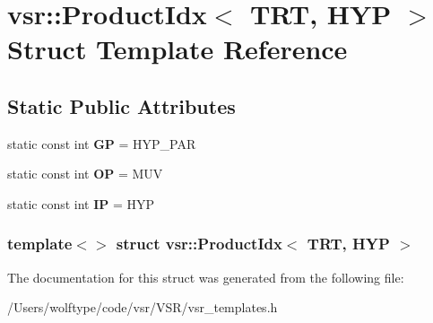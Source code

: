 \hypertarget{structvsr_1_1_product_idx_3_01_t_r_t_00_01_h_y_p_01_4}{\section{vsr\-:\-:Product\-Idx$<$ T\-R\-T, H\-Y\-P $>$ Struct Template Reference}
\label{structvsr_1_1_product_idx_3_01_t_r_t_00_01_h_y_p_01_4}
}
\subsection*{Static Public Attributes}
\begin{DoxyCompactItemize}
\item 
\hypertarget{structvsr_1_1_product_idx_3_01_t_r_t_00_01_h_y_p_01_4_a8ae117eaa8ab9dbee3e208f038806dd3}{static const int {\bfseries G\-P} = H\-Y\-P\-\_\-\-P\-A\-R}\label{structvsr_1_1_product_idx_3_01_t_r_t_00_01_h_y_p_01_4_a8ae117eaa8ab9dbee3e208f038806dd3}

\item 
\hypertarget{structvsr_1_1_product_idx_3_01_t_r_t_00_01_h_y_p_01_4_aea090e492059ee434143a34d7e7cd7ef}{static const int {\bfseries O\-P} = M\-U\-V}\label{structvsr_1_1_product_idx_3_01_t_r_t_00_01_h_y_p_01_4_aea090e492059ee434143a34d7e7cd7ef}

\item 
\hypertarget{structvsr_1_1_product_idx_3_01_t_r_t_00_01_h_y_p_01_4_abe1ac4fbc20ad8e08b289d61d174f6ee}{static const int {\bfseries I\-P} = H\-Y\-P}\label{structvsr_1_1_product_idx_3_01_t_r_t_00_01_h_y_p_01_4_abe1ac4fbc20ad8e08b289d61d174f6ee}

\end{DoxyCompactItemize}
\subsubsection*{template$<$$>$ struct vsr\-::\-Product\-Idx$<$ T\-R\-T, H\-Y\-P $>$}



The documentation for this struct was generated from the following file\-:\begin{DoxyCompactItemize}
\item 
/\-Users/wolftype/code/vsr/\-V\-S\-R/vsr\-\_\-templates.\-h\end{DoxyCompactItemize}
